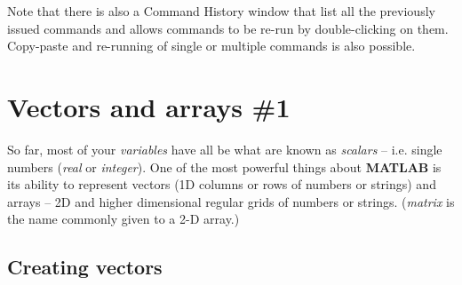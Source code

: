 \documentclass{tufte-book} %
\begin{document}
Note that there is also a \textsf{Command History} window that list all the previously issued commands and allows commands to be re-run by double-clicking on them. Copy-paste and re-running of single or multiple commands is also possible.


\newpage


\section{Vectors and arrays \#1}

So far, most of your \textit{variables} have all be what are known as \textit{scalars} -- i.e. single numbers (\textit{real} or \textit{integer}).
One of the most powerful things about \textbf{MATLAB} is its ability to represent vectors (1D columns or rows of numbers or strings) and arrays -- 2D and higher dimensional regular grids of numbers or strings. (\textit{matrix} is the name commonly given to a 2-D array.)
 

\subsection{Creating vectors}
\end{document}
